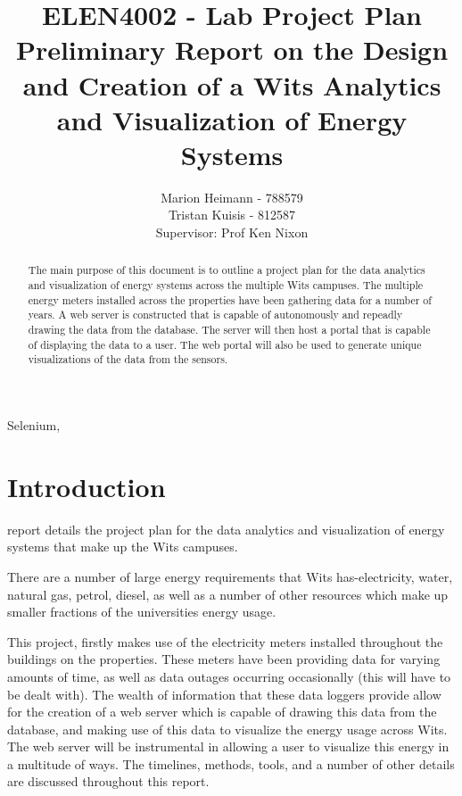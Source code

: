 \documentclass[12pt,onecolumn]{IEEEtran}
\begin{document}
\author{Marion Heimann - 788579 \\ Tristan Kuisis - 812587 \\ Supervisor: Prof Ken Nixon}
\title{ELEN4002 - Lab Project Plan \\ Preliminary Report on the Design and Creation of a Wits Analytics and Visualization of Energy Systems}
\maketitle
\begin{abstract}
    The main purpose of this document is to outline a project plan for the data analytics and visualization of energy systems across the multiple Wits campuses. The multiple energy meters installed across the properties have been gathering data for a number of years. A web server is constructed that is capable of autonomously and repeadly drawing the data from the database. The server will then host a portal that is capable of displaying the data to a user. The web portal will also be used to generate unique visualizations of the data from the sensors.
\end{abstract}
\begin{IEEEkeywords} 
Selenium, 
\end{IEEEkeywords}
\pagestyle{plain}



\section{Introduction} \label{sec:Introduction}
 report details the project plan for the data analytics and visualization of energy systems that make up the Wits campuses. 

There are a number of large energy requirements that Wits has-electricity, water, natural gas, petrol, diesel, as well as a number of other resources which make up smaller fractions of the universities energy usage.

This project, firstly makes use of the electricity meters installed throughout the buildings on the properties. These meters have been providing data for varying amounts of time, as well as data outages occurring occasionally (this will have to be dealt with). 
The wealth of information that these data loggers provide allow for the creation of a web server which is capable of drawing this data from the database, and making use of this data to visualize the energy usage across Wits. The web server will be instrumental in allowing a user to visualize this energy in a multitude of ways. 
The timelines, methods, tools, and a number of other details are discussed throughout this report.
\end{document}

